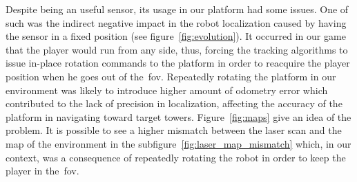Despite being an useful sensor, its usage in our platform had some issues. One of such was the indirect negative impact in the robot localization caused by having the sensor in a fixed position (see figure~\ref{fig:evolution}). It occurred in our game that the player would run from any side, thus, forcing the tracking algorithms to issue in-place rotation commands to the platform in order to reacquire the player position when he goes out of the~\gls{fov}. Repeatedly rotating the platform in our environment was likely to introduce higher amount of odometry error which contributed to the lack of precision in localization, affecting the accuracy of the platform in navigating toward target towers. Figure~\ref{fig:maps} give an idea of the problem. It is possible to see a higher mismatch between the laser scan and the map of the environment in the subfigure~\ref{fig:laser_map_mismatch} which, in our context, was a consequence of repeatedly rotating the robot in order to keep the player in the~\gls{fov}. 

